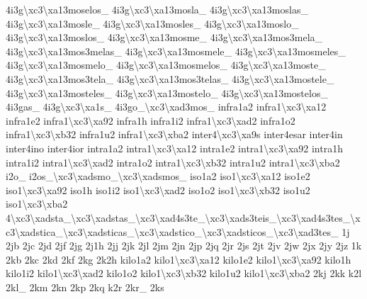 \begin{DoxyCompactItemize}
4i3g\textbackslash{}xc3\textbackslash{}xa13moselos\-\_\- 4i3g\textbackslash{}xc3\textbackslash{}xa13mosla\-\_\- 4i3g\textbackslash{}xc3\textbackslash{}xa13moslas\-\_\- 4i3g\textbackslash{}xc3\textbackslash{}xa13mosle\-\_\- 4i3g\textbackslash{}xc3\textbackslash{}xa13mosles\-\_\- 4i3g\textbackslash{}xc3\textbackslash{}xa13moslo\-\_\- 4i3g\textbackslash{}xc3\textbackslash{}xa13moslos\-\_\- 4i3g\textbackslash{}xc3\textbackslash{}xa13mosme\-\_\- 4i3g\textbackslash{}xc3\textbackslash{}xa13mos3mela\-\_\- 4i3g\textbackslash{}xc3\textbackslash{}xa13mos3melas\-\_\- 4i3g\textbackslash{}xc3\textbackslash{}xa13mosmele\-\_\- 4i3g\textbackslash{}xc3\textbackslash{}xa13mosmeles\-\_\- 4i3g\textbackslash{}xc3\textbackslash{}xa13mosmelo\-\_\- 4i3g\textbackslash{}xc3\textbackslash{}xa13mosmelos\-\_\- 4i3g\textbackslash{}xc3\textbackslash{}xa13moste\-\_\- 4i3g\textbackslash{}xc3\textbackslash{}xa13mos3tela\-\_\- 4i3g\textbackslash{}xc3\textbackslash{}xa13mos3telas\-\_\- 4i3g\textbackslash{}xc3\textbackslash{}xa13mostele\-\_\- 4i3g\textbackslash{}xc3\textbackslash{}xa13mosteles\-\_\- 4i3g\textbackslash{}xc3\textbackslash{}xa13mostelo\-\_\- 4i3g\textbackslash{}xc3\textbackslash{}xa13mostelos\-\_\- 4i3gas\-\_\- 4i3g\textbackslash{}xc3\textbackslash{}xa1s\-\_\- 4i3go\-\_\textbackslash{}xc3\textbackslash{}xad3mos\-\_\- infra1a2 infra1\textbackslash{}xc3\textbackslash{}xa12 infra1e2 infra1\textbackslash{}xc3\textbackslash{}xa92 infra1h infra1i2 infra1\textbackslash{}xc3\textbackslash{}xad2 infra1o2 infra1\textbackslash{}xc3\textbackslash{}xb32 infra1u2 infra1\textbackslash{}xc3\textbackslash{}xba2 inter4\textbackslash{}xc3\textbackslash{}xa9s inter4esar inter4in inter4ino inter4ior intra1a2 intra1\textbackslash{}xc3\textbackslash{}xa12 intra1e2 intra1\textbackslash{}xc3\textbackslash{}xa92 intra1h intra1i2 intra1\textbackslash{}xc3\textbackslash{}xad2 intra1o2 intra1\textbackslash{}xc3\textbackslash{}xb32 intra1u2 intra1\textbackslash{}xc3\textbackslash{}xba2 i2o\-\_\- i2os\-\_\textbackslash{}xc3\textbackslash{}xadsmo\-\_\textbackslash{}xc3\textbackslash{}xadsmos\-\_\- iso1a2 iso1\textbackslash{}xc3\textbackslash{}xa12 iso1e2 iso1\textbackslash{}xc3\textbackslash{}xa92 iso1h iso1i2 iso1\textbackslash{}xc3\textbackslash{}xad2 iso1o2 iso1\textbackslash{}xc3\textbackslash{}xb32 iso1u2 iso1\textbackslash{}xc3\textbackslash{}xba2 4\textbackslash{}xc3\textbackslash{}xadsta\-\_\textbackslash{}xc3\textbackslash{}xadstas\-\_\textbackslash{}xc3\textbackslash{}xad4s3te\-\_\textbackslash{}xc3\textbackslash{}xads3teis\-\_\textbackslash{}xc3\textbackslash{}xad4s3tes\-\_\textbackslash{}xc3\textbackslash{}xadstica\-\_\textbackslash{}xc3\textbackslash{}xadsticas\-\_\textbackslash{}xc3\textbackslash{}xadstico\-\_\textbackslash{}xc3\textbackslash{}xadsticos\-\_\textbackslash{}xc3\textbackslash{}xad3tes\-\_\- 1j 2jb 2jc 2jd 2jf 2jg 2j1h 2jj 2jk 2jl 2jm 2jn 2jp 2jq 2jr 2js 2jt 2jv 2jw 2jx 2jy 2jz 1k 2kb 2kc 2kd 2kf 2kg 2k2h kilo1a2 kilo1\textbackslash{}xc3\textbackslash{}xa12 kilo1e2 kilo1\textbackslash{}xc3\textbackslash{}xa92 kilo1h kilo1i2 kilo1\textbackslash{}xc3\textbackslash{}xad2 kilo1o2 kilo1\textbackslash{}xc3\textbackslash{}xb32 kilo1u2 kilo1\textbackslash{}xc3\textbackslash{}xba2 2kj 2kk k2l 2kl\-\_\- 2km 2kn 2kp 2kq k2r 2kr\-\_\- 2ks 
\end{DoxyCompactItemize}
